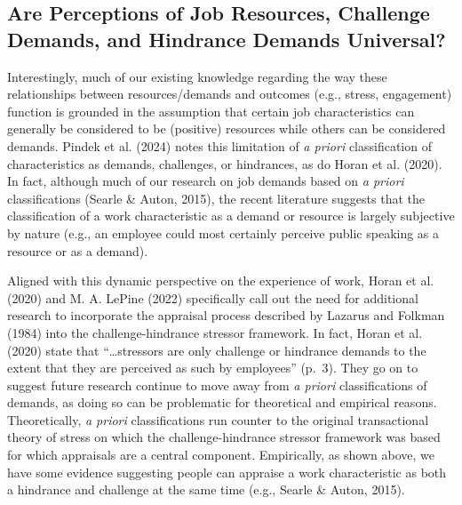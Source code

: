 \documentclass[
  man,mask]{apa7}
\begin{document}
\hypertarget{are-perceptions-of-job-resources-challenge-demands-and-hindrance-demands-universal}{%
\subsection{Are Perceptions of Job Resources, Challenge Demands, and Hindrance Demands Universal?}\label{are-perceptions-of-job-resources-challenge-demands-and-hindrance-demands-universal}}

Interestingly, much of our existing knowledge regarding the way these relationships between resources/demands and outcomes (e.g., stress, engagement) function is grounded in the assumption that certain job characteristics can generally be considered to be (positive) resources while others can be considered demands. Pindek et al. (2024) notes this limitation of \emph{a priori} classification of characteristics as demands, challenges, or hindrances, as do Horan et al. (2020). In fact, although much of our research on job demands based on \emph{a priori} classifications (Searle \& Auton, 2015), the recent literature suggests that the classification of a work characteristic as a demand or resource is largely subjective by nature (e.g., an employee could most certainly perceive public speaking as a resource or as a demand).

Aligned with this dynamic perspective on the experience of work, Horan et al. (2020) and M. A. LePine (2022) specifically call out the need for additional research to incorporate the appraisal process described by Lazarus and Folkman (1984) into the challenge-hindrance stressor framework. In fact, Horan et al. (2020) state that ``\ldots stressors are only challenge or hindrance demands to the extent that they are perceived as such by employees'' (p.~3). They go on to suggest future research continue to move away from \emph{a priori} classifications of demands, as doing so can be problematic for theoretical and empirical reasons. Theoretically, \emph{a priori} classifications run counter to the original transactional theory of stress on which the challenge-hindrance stressor framework was based for which appraisals are a central component. Empirically, as shown above, we have some evidence suggesting people can appraise a work characteristic as both a hindrance and challenge at the same time (e.g., Searle \& Auton, 2015).
\end{document}
